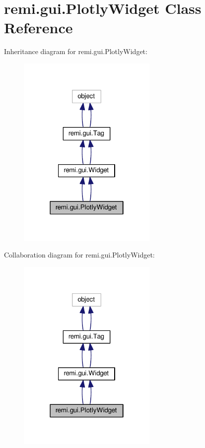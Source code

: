 \hypertarget{classremi_1_1gui_1_1PlotlyWidget}{}\section{remi.\+gui.\+Plotly\+Widget Class Reference}
\label{classremi_1_1gui_1_1PlotlyWidget}


Inheritance diagram for remi.\+gui.\+Plotly\+Widget\+:
\nopagebreak
\begin{figure}[H]
\begin{center}
\leavevmode
\includegraphics[width=190pt]{d9/d11/classremi_1_1gui_1_1PlotlyWidget__inherit__graph}
\end{center}
\end{figure}


Collaboration diagram for remi.\+gui.\+Plotly\+Widget\+:
\nopagebreak
\begin{figure}[H]
\begin{center}
\leavevmode
\includegraphics[width=190pt]{dc/d77/classremi_1_1gui_1_1PlotlyWidget__coll__graph}
\end{center}
\end{figure}
